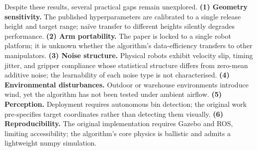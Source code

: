 Despite these results, several practical gaps remain unexplored.
\textbf{(1) Geometry sensitivity.}
The published hyperparameters are calibrated to a single release height and target range;
na\"ive transfer to different heights silently degrades performance.
\textbf{(2) Arm portability.}
The paper is locked to a single robot platform; it is unknown whether the algorithm's
data-efficiency transfers to other manipulators.
\textbf{(3) Noise structure.}
Physical robots exhibit velocity slip, timing jitter, and gripper compliance whose
statistical structure differs from zero-mean additive noise; the learnability of each
noise type is not characterised.
\textbf{(4) Environmental disturbances.}
Outdoor or warehouse environments introduce wind, yet the algorithm has not been tested
under ambient airflow.
\textbf{(5) Perception.}
Deployment requires autonomous bin detection; the original work pre-specifies target
coordinates rather than detecting them visually.
\textbf{(6) Reproducibility.}
The original implementation requires Gazebo and ROS, limiting accessibility; the
algorithm's core physics is ballistic and admits a lightweight numpy simulation.

